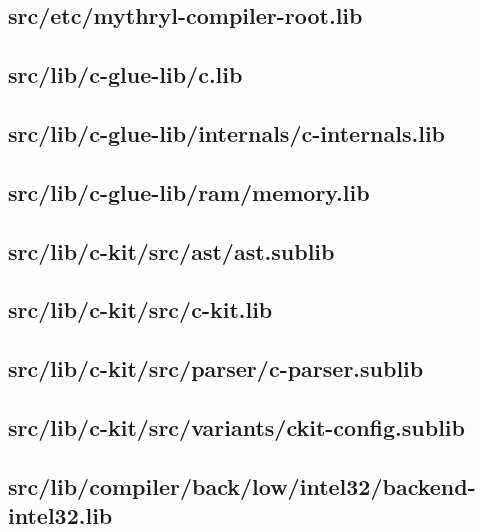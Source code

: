 \subsection{src/etc/mythryl-compiler-root.lib}


\subsection{src/lib/c-glue-lib/c.lib}


\subsection{src/lib/c-glue-lib/internals/c-internals.lib}


\subsection{src/lib/c-glue-lib/ram/memory.lib}


\subsection{src/lib/c-kit/src/ast/ast.sublib}


\subsection{src/lib/c-kit/src/c-kit.lib}


\subsection{src/lib/c-kit/src/parser/c-parser.sublib}


\subsection{src/lib/c-kit/src/variants/ckit-config.sublib}


\subsection{src/lib/compiler/back/low/intel32/backend-intel32.lib}


